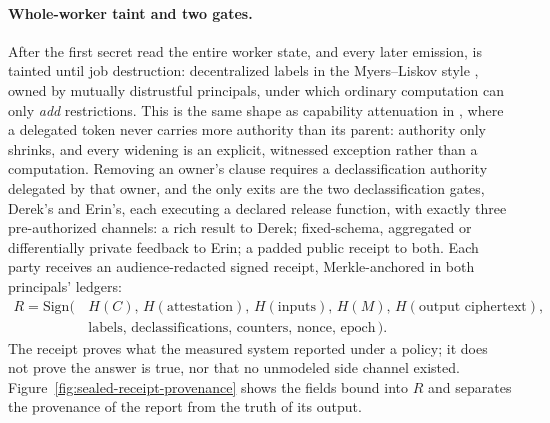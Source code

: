 \documentclass[11pt,a4paper]{article}
\theoremstyle{definition}
\begin{document}

\paragraph{Whole-worker taint and two gates.}
After the first secret read the entire worker state, and every later emission,
is tainted until job destruction: decentralized labels in the Myers--Liskov
style , owned by mutually distrustful principals, under
which ordinary computation can only \emph{add} restrictions. This is the same
shape as capability attenuation in ,
where a delegated token never carries more authority than its parent:
authority only shrinks, and every widening is an explicit, witnessed exception
rather than a computation. Removing an owner's clause requires a
declassification authority delegated by that owner, and the only exits are the
two declassification gates, Derek's and Erin's, each executing a declared
release function, with exactly three pre-authorized channels: a rich result to
Derek; fixed-schema, aggregated or differentially private feedback to Erin; a
padded public receipt to both. Each party receives an audience-redacted signed
receipt, Merkle-anchored in both principals' ledgers:
{\small\[
\begin{aligned}
R=\mathrm{Sign}\bigl(\, & H(C),\,H(\text{attestation}),\,H(\text{inputs}),\,H(M),\,H(\text{output ciphertext}),\\
& \text{labels},\,\text{declassifications},\,\text{counters},\,\text{nonce},\,\text{epoch}\,\bigr).
\end{aligned}
\]} The receipt proves what the
measured system reported under a policy; it does not prove the answer is true,
nor that no unmodeled side channel existed. Figure~\ref{fig:sealed-receipt-provenance}
shows the fields bound into $R$ and separates the provenance of the report
from the truth of its output.



\ifdefined\pdswisslandmarkplate
\begin{figure}[p]
  \centering
\end{figure}
\fi
\end{document}
